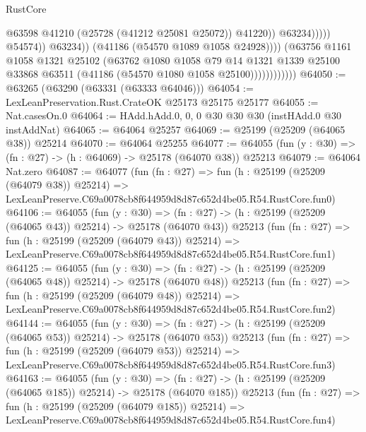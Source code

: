 \begin{lexlean}{RustCore}
\begin{coremodule}
                                              @63598
                                              @41210
                                              (@25728 (@41212 @25081 @25072))
                                              @41220))
                                          @63234)))))
                                @54574))
                            @63234))
                        (@41186 (@54570 @1089 @1058 @24928))))
                    (@63756
                      @1161
                      @1058
                      @1321
                      @25102
                      (@63762
                        @1080
                        @1058
                        @79
                        @14
                        @1321
                        @1339
                        @25100
                        @33868
                        @63511
                        (@41186 (@54570 @1080 @1058 @25100))))))))))))
@64050 := @63265 (@63290 (@63331 (@63333 @64046)))
@64054 := LexLeanPreservation.Rust.CrateOK @25173 @25175 @25177
@64055 := Nat.casesOn.{0}
@64064 := HAdd.hAdd.{0, 0, 0} @30 @30 @30 (instHAdd.{0} @30 instAddNat)
@64065 := @64064 @25257
@64069 := @25199 (@25209 (@64065 @38)) @25214
@64070 := @64064 @25255
@64077 := @64055 (fun (y : @30) => (fn : @27) -> (h : @64069) -> @25178 (@64070 @38)) @25213
@64079 := @64064 Nat.zero
@64087 := @64077
    (fun (fn : @27) =>
    fun (h : @25199 (@25209 (@64079 @38)) @25214) =>
    LexLeanPreserve.C69a0078cb8f644959d8d87c652d4be05.R54.RustCore.fun0)
@64106 := @64055
    (fun (y : @30) =>
    (fn : @27) -> (h : @25199 (@25209 (@64065 @43)) @25214) -> @25178 (@64070 @43))
    @25213
    (fun (fn : @27) =>
    fun (h : @25199 (@25209 (@64079 @43)) @25214) =>
    LexLeanPreserve.C69a0078cb8f644959d8d87c652d4be05.R54.RustCore.fun1)
@64125 := @64055
    (fun (y : @30) =>
    (fn : @27) -> (h : @25199 (@25209 (@64065 @48)) @25214) -> @25178 (@64070 @48))
    @25213
    (fun (fn : @27) =>
    fun (h : @25199 (@25209 (@64079 @48)) @25214) =>
    LexLeanPreserve.C69a0078cb8f644959d8d87c652d4be05.R54.RustCore.fun2)
@64144 := @64055
    (fun (y : @30) =>
    (fn : @27) -> (h : @25199 (@25209 (@64065 @53)) @25214) -> @25178 (@64070 @53))
    @25213
    (fun (fn : @27) =>
    fun (h : @25199 (@25209 (@64079 @53)) @25214) =>
    LexLeanPreserve.C69a0078cb8f644959d8d87c652d4be05.R54.RustCore.fun3)
@64163 := @64055
    (fun (y : @30) =>
    (fn : @27) -> (h : @25199 (@25209 (@64065 @185)) @25214) -> @25178 (@64070 @185))
    @25213
    (fun (fn : @27) =>
    fun (h : @25199 (@25209 (@64079 @185)) @25214) =>
    LexLeanPreserve.C69a0078cb8f644959d8d87c652d4be05.R54.RustCore.fun4)

\end{coremodule}
\end{lexlean}
